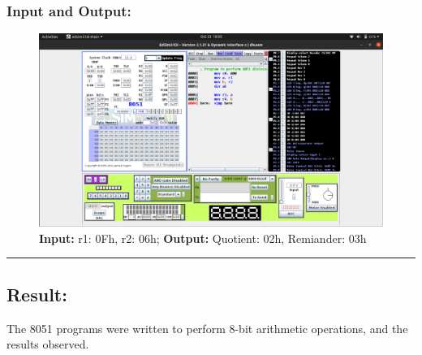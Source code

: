 \documentclass[12pt,a4paper]{article}
\begin{document}
\begin{flushleft}
\subsubsection*{\textbf{Input and Output:}}
\begin{figure}[h]
    \centering
    \includegraphics[trim = 60mm 75mm 60mm 10mm, clip, width = \textwidth]{Pics/Div.png}
    \caption{ \textbf{Input:} r1: 0Fh, r2: 06h; 
              \textbf{Output:} Quotient: 02h, Remiander: 03h}
\end{figure}
\hrule
\subsection*{\textbf{Result:}}
The 8051 programs were written to perform 8-bit arithmetic operations, and the results observed.
\end{flushleft}
\end{document}
